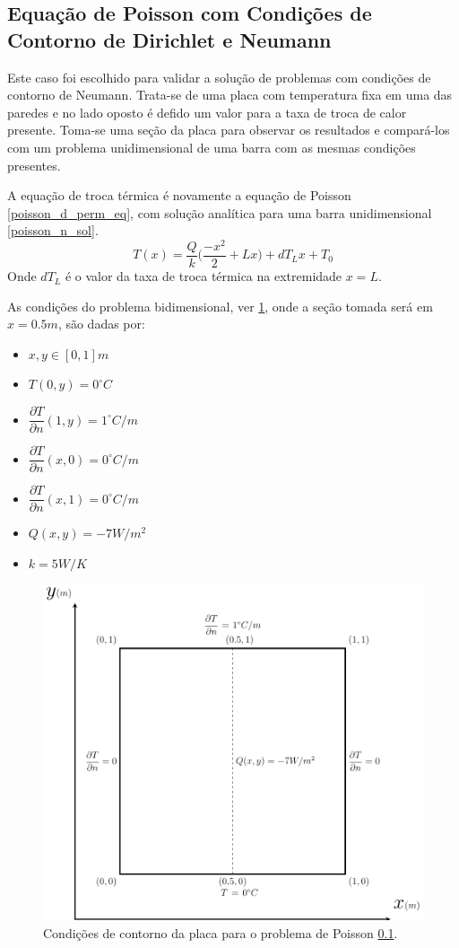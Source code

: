 \subsection{\textbf{Equação de Poisson com Condições de Contorno de Dirichlet e Neumann}}
\label{sec_poisson_neu}
Este caso foi escolhido para validar a solução de problemas com condições de contorno de Neumann.
Trata-se de uma placa com temperatura fixa em uma das paredes e no lado oposto é defido um valor para a taxa de troca de calor presente.
Toma-se uma seção da placa para observar os resultados e compará-los com um problema unidimensional de uma barra com as mesmas condições presentes.

A equação de troca térmica é novamente a equação de Poisson \ref{poisson_d_perm_eq}, com solução analítica para uma barra unidimensional \ref{poisson_n_sol}.
\begin{equation}
    T(x) = \dfrac{Q}{k}\Big(\dfrac{-x^2}{2} + L x\Big) + dT_L x + T_0
    \label{poisson_n_sol} 
\end{equation}
Onde $dT_L$ é o valor da taxa de troca térmica na extremidade $x=L$.

As condições do problema bidimensional, ver \ref{poisson_n_bc}, onde a seção tomada será em $x=0.5m$, são dadas por:
\begin{itemize}
    \item $x,y\in [0,1]m$
    \item $T(0,y) = 0^{\circ}C$
    \item $\dfrac{\partial T}{\partial n}(1,y) = 1^{\circ}C/m$
    \item $\dfrac{\partial T}{\partial n}(x,0) = 0^{\circ}C/m$
    \item $\dfrac{\partial T}{\partial n}(x,1) = 0^{\circ}C/m$
    \item $Q(x,y) = -7W/m^2$
    \item $k = 5W/K$
\end{itemize}

\begin{figure}[H]
    \centering
    \includegraphics[width=.7\linewidth]{figures/poisson_neumann_boundary_conditions.pdf}
    \caption{Condições de contorno da placa para o problema de Poisson \ref{sec_poisson_neu}.}
    \label{poisson_n_bc}
\end{figure}

